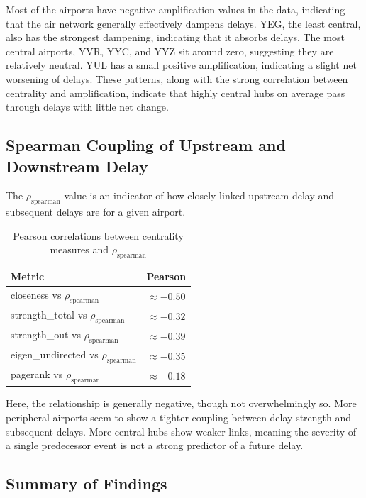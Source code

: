 \documentclass[9pt]{article}
\begin{document}
Most of the airports have negative amplification values in the data, indicating that the air network generally effectively dampens delays. YEG, the least central, also has the strongest dampening, indicating that it absorbs delays. The most central airports, YVR, YYC, and YYZ sit around zero, suggesting they are relatively neutral. YUL has a small positive amplification, indicating a slight net worsening of delays. These patterns, along with the strong correlation between centrality and amplification, indicate that highly central hubs on average pass through delays with little net change.

\subsection{Spearman Coupling of Upstream and Downstream Delay}

The $\rho_{\text{spearman}}$ value is an indicator of how closely linked upstream delay and subsequent delays are for a given airport.

\begin{table}[h!]
    \centering
    \caption{Pearson correlations between centrality measures and $\rho_{\text{spearman}}$}
    \begin{tabular}{l c}
        \toprule
        Metric & Pearson \\
        \midrule
        closeness vs $\rho_{\text{spearman}}$        & $\approx -0.50$ \\
        strength\_total vs $\rho_{\text{spearman}}$  & $\approx -0.32$ \\
        strength\_out vs $\rho_{\text{spearman}}$    & $\approx -0.39$ \\
        eigen\_undirected vs $\rho_{\text{spearman}}$& $\approx -0.35$ \\
        pagerank vs $\rho_{\text{spearman}}$         & $\approx -0.18$ \\
        \bottomrule
    \end{tabular}
\end{table}

Here, the relationship is generally negative, though not overwhelmingly so. More peripheral airports seem to show a tighter coupling between delay strength and subsequent delays. More central hubs show weaker links, meaning the severity of a single predecessor event is not a strong predictor of a future delay.

\subsection{Summary of Findings}
\end{document}
